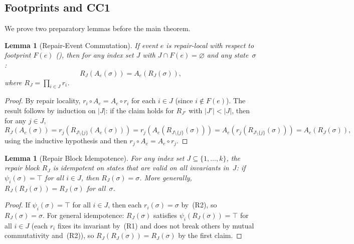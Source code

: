 \documentclass[11pt,a4paper]{article}
\theoremstyle{plain}
\newtheorem{lemma}[theorem]{Lemma}
\theoremstyle{definition}
\theoremstyle{remark}
\renewcommand{\_}{\textunderscore\allowbreak}
\begin{document}
\subsection{Footprints and CC1}

We prove two preparatory lemmas before the main theorem.

\begin{lemma}[Repair-Event Commutation]
\label{lem:repair-commute}
If event $e$ is repair-local with respect to footprint $F(e)$
(), then for any index set $J$ with
$J \cap F(e) = \varnothing$ and any state~$\sigma$:
\[
R_J(A_e(\sigma)) = A_e(R_J(\sigma)),
\]
where $R_J = \prod_{i \in J} r_i$.
\end{lemma}

\begin{proof}
By repair locality, $r_i \circ A_e = A_e \circ r_i$ for each $i \in J$
(since $i \notin F(e)$).  The result follows by induction on $|J|$: if the
claim holds for $R_{J'}$ with $|J'| < |J|$, then for any $j \in J$,
\[
R_J(A_e(\sigma)) = r_j(R_{J \setminus \{j\}}(A_e(\sigma)))
= r_j(A_e(R_{J \setminus \{j\}}(\sigma)))
= A_e(r_j(R_{J \setminus \{j\}}(\sigma)))
= A_e(R_J(\sigma)),
\]
using the inductive hypothesis and then $r_j \circ A_e = A_e \circ r_j$.
\end{proof}

\begin{lemma}[Repair Block Idempotence]
\label{lem:repair-idempotent}
For any index set $J \subseteq \{1,\ldots,k\}$, the repair block $R_J$ is
idempotent on states that are valid on all invariants in~$J$: if
$\psi_i(\sigma) = \top$ for all $i \in J$, then $R_J(\sigma) = \sigma$.
More generally, $R_J(R_J(\sigma)) = R_J(\sigma)$ for all~$\sigma$.
\end{lemma}

\begin{proof}
If $\psi_i(\sigma) = \top$ for all $i \in J$, then each $r_i(\sigma) = \sigma$
by~(R2), so $R_J(\sigma) = \sigma$.  For general idempotence: $R_J(\sigma)$
satisfies $\psi_i(R_J(\sigma)) = \top$ for all $i \in J$ (each $r_i$ fixes its
invariant by~(R1) and does not break others by mutual commutativity and~(R2)),
so $R_J(R_J(\sigma)) = R_J(\sigma)$ by the first claim.
\end{proof}
\end{document}
